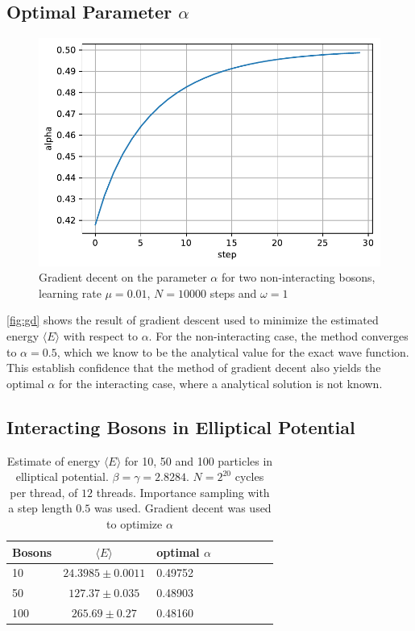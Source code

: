 \subsection{Optimal Parameter \(\alpha\)}
\begin{figure}
	\includegraphics[width=.8\linewidth]{figures/gd.pdf}
	\centering
	\caption{Gradient decent on the parameter $\alpha$ for two non-interacting bosons, learning rate $\mu = 0.01$, $N = 10000$ steps and $\omega = 1$}
	\label{fig:gd}
\end{figure}

\autoref{fig:gd} shows the result of gradient descent used to minimize the estimated energy $\langle E \rangle$ with respect to $\alpha$. For the non-interacting case, the method converges to $\alpha = 0.5$, which we know to be the analytical value for the exact wave function. This establish confidence that the method of gradient decent also yields the optimal $\alpha$ for the interacting case, where a analytical solution is not known. 

\subsection{Interacting Bosons in Elliptical Potential}

\begin{table}[t]
	\begin{tabular}{lclclclc}
		\hline
		\hline
		Bosons & \(\langle E \rangle\) & optimal $\alpha$\\
		\hline
		10 & \(24.3985 \pm 0.0011\) & 0.49752\\
		50 & \(127.37 \pm 0.035\) & 0.48903\\
		100 & \(265.69 \pm 0.27\) & 0.48160\\
		\hline
	\end{tabular}
	\caption{Estimate of energy $\langle E \rangle$ for 10, 50 and 100 particles in elliptical potential. $\beta = \gamma = 2.8284$. $N = 2^20$ cycles per thread, of $12$ threads. Importance sampling with a step length $0.5$ was used. Gradient decent was used to optimize $\alpha$}
	\label{tab:energies}
\end{table}

